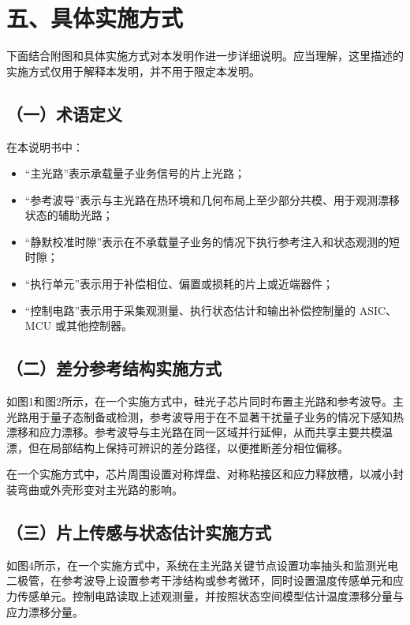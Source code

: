 \documentclass[12pt,a4paper]{article}
\begin{document}
\section*{五、具体实施方式}

下面结合附图和具体实施方式对本发明作进一步详细说明。应当理解，这里描述的实施方式仅用于解释本发明，并不用于限定本发明。

\subsection*{（一）术语定义}

在本说明书中：
\begin{itemize}[leftmargin=2em]
    \item ``主光路''表示承载量子业务信号的片上光路；
    \item ``参考波导''表示与主光路在热环境和几何布局上至少部分共模、用于观测漂移状态的辅助光路；
    \item ``静默校准时隙''表示在不承载量子业务的情况下执行参考注入和状态观测的短时隙；
    \item ``执行单元''表示用于补偿相位、偏置或损耗的片上或近端器件；
    \item ``控制电路''表示用于采集观测量、执行状态估计和输出补偿控制量的 ASIC、MCU 或其他控制器。
\end{itemize}

\subsection*{（二）差分参考结构实施方式}

如图1和图2所示，在一个实施方式中，硅光子芯片同时布置主光路和参考波导。主光路用于量子态制备或检测，参考波导用于在不显著干扰量子业务的情况下感知热漂移和应力漂移。参考波导与主光路在同一区域并行延伸，从而共享主要共模温漂，但在局部结构上保持可辨识的差分路径，以便推断差分相位偏移。

在一个实施方式中，芯片周围设置对称焊盘、对称粘接区和应力释放槽，以减小封装弯曲或外壳形变对主光路的影响。

\subsection*{（三）片上传感与状态估计实施方式}

如图4所示，在一个实施方式中，系统在主光路关键节点设置功率抽头和监测光电二极管，在参考波导上设置参考干涉结构或参考微环，同时设置温度传感单元和应力传感单元。控制电路读取上述观测量，并按照状态空间模型估计温度漂移分量与应力漂移分量。
\end{document}
